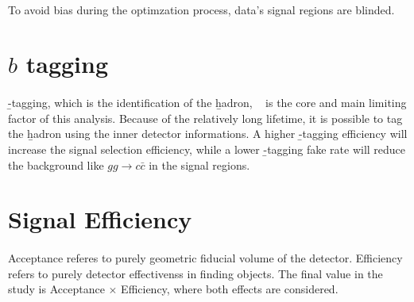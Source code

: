 \paragraph{}
To avoid bias during the optimzation process, data's signal regions are blinded.


\section{$b$ tagging}
\paragraph{}
\b-tagging, which is the identification of the \b hadron,  ~\cite{Reco-btag-2016} is the core and main limiting factor of this analysis. Because of the relatively long lifetime, it is possible to tag the \b hadron using the inner detector informations. A higher \b-tagging efficiency will increase the signal selection efficiency, while a lower \b-tagging fake rate will reduce the background like $gg \to c\bar{c}$ in the signal regions.


\section{Signal Efficiency}
\paragraph{}
Acceptance referes to purely geometric fiducial volume of the detector. Efficiency refers to purely detector effectivenss in finding objects. The final value in the study is Acceptance $\times$ Efficiency, where both effects are considered.

















